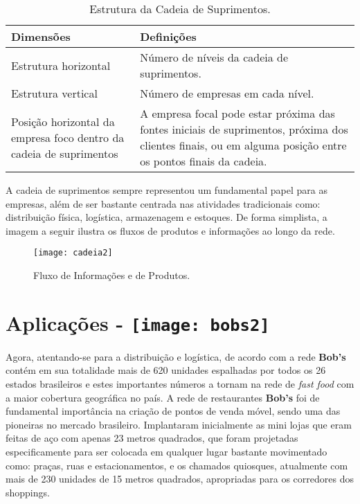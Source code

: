 		\label{subsubsec:cadeia_table}
		\begin{table}[h]
			\centering
			\begin{tabular}{|p{6cm}|p{8cm}|}
				\hline
				\textbf{Dimensões} & \textbf{Definições}  \\ \hline
				Estrutura horizontal & Número de níveis da cadeia de suprimentos. \\ \hline
				Estrutura vertical & Número de empresas em cada nível. \\ \hline
				Posição horizontal da empresa foco dentro da cadeia de suprimentos & A empresa focal pode estar próxima das fontes iniciais de suprimentos, próxima dos clientes finais, ou em alguma posição entre os pontos finais da cadeia. \\ \hline
			\end{tabular}
			\caption[Estrutura da Cadeia de Suprimentos]{Estrutura da Cadeia de Suprimentos. \cite{chopra}}
			\label{tab:cadeia_.table}
		\end{table}

		A cadeia de suprimentos sempre representou um fundamental papel para as empresas, além de ser bastante centrada nas atividades tradicionais como: distribuição física, logística, armazenagem e estoques. De forma simplista, a imagem a seguir ilustra os fluxos de produtos e informações ao longo da rede.

		\begin{figure}[h]
			\centering
			\texttt{[image: cadeia2]}
			\caption[Fluxo de informações e de produtos]{Fluxo de Informações e de Produtos.}
			\label{fig:cadeia2}
		\end{figure}

	\section[Aplicações]{Aplicações - \texttt{[image: bobs2]}}
	\label{sec:cadeia_aplicacoes}

		Agora, atentando-se para a distribuição e logística, de acordo com \cite{junior} a rede \textbf{Bob’s} contém em sua totalidade mais de 620 unidades espalhadas por todos os 26 estados brasileiros e estes importantes números a tornam na rede de \emph{fast food} com a maior cobertura geográfica no país. A rede de restaurantes \textbf{Bob’s} foi de fundamental importância na criação de pontos de venda móvel, sendo uma das pioneiras no mercado brasileiro. Implantaram inicialmente as mini lojas que eram feitas de aço com apenas 23 metros quadrados, que foram projetadas especificamente para ser colocada em qualquer lugar bastante movimentado como: praças, ruas e estacionamentos, e os chamados quiosques, atualmente com mais de 230 unidades de 15 metros quadrados, apropriadas para os corredores dos shoppings.

